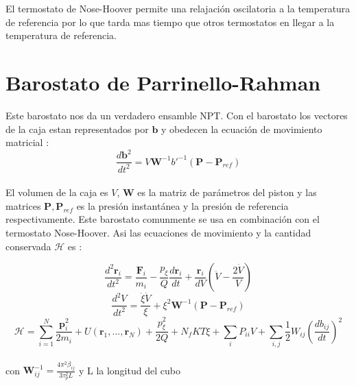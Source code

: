 El termostato de Nose-Hoover permite una relajación oscilatoria a la temperatura de referencia por lo que tarda mas tiempo que otros termostatos en llegar a la temperatura de referencia.\\

\section{Barostato de Parrinello-Rahman}

Este barostato nos da un verdadero ensamble NPT. Con el barostato los vectores de la caja estan representados por $\mathbf{b}$ y obedecen la ecuación de movimiento matricial\cite{gromacsdoc} \cite{simone1993}:\\

\begin{equation} \label{parrrahman}
    \frac{d\mathbf{b}^2}{dt^2}=V\mathbf{W}^{-1}b'^{-1}(\mathbf{P}-\mathbf{P}_{ref})
\end{equation}\\

El volumen de la caja es $V$, $\mathbf{W}$ es la matriz de parámetros del piston y las matrices $\mathbf{P},\mathbf{P}_{ref}$ es la presión instantánea y la presión de referencia respectivamente. Este barostato comunmente se usa en combinación con el termostato Nose-Hoover. Asi las ecuaciones de movimiento y la cantidad conservada $\mathcal{H}$ es \cite{gromacsdoc}:

\begin{equation} \label{NHPRmotionr}
    \frac{d^2\mathbf{r}_i}{dt^2} = \frac{\mathbf{F}_i}{m_i}-\frac{p_\xi}{Q}\frac{d\mathbf{r}_i}{dt} + \frac{\mathbf{r}_i}{dV}\left(\ddot{V}-\frac{2\dot{V}}{V}\right)
\end{equation}
\begin{equation} \label{NHPRmotionV}
    \frac{d^2 V}{dt^2} = \frac{\dot{\xi}\dot{V}}{\xi} + \xi^2\mathbf{W}^{-1}(\mathbf{P}-\mathbf{P}_{ref})
\end{equation}
\begin{equation} \label{conservedNoseHooverParrRahm}
    \mathcal{H} = \sum_{i=1}^{N}\frac{\mathbf{p}_i^2}{2m_i} + U(\mathbf{r}_1,...,\mathbf{r}_N)+\frac{p_\xi^2}{2Q} + N_fKT\xi + \sum_i P_{ii}V + \sum_{i,j}\frac{1}{2}W_{ij}\left(\frac{db_{ij}}{dt}\right)^2
\end{equation}\\

con $\mathbf{W}^{-1}_{ij}=\frac{4\pi^2 \beta_{ij}}{3\tau_{p}^2 L}$ y L la longitud del cubo

